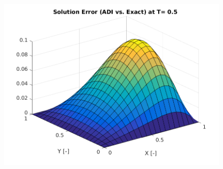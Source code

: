 \documentclass[12pt]{article}
\begin{document}
	\begin{figure}[H]
		\centering
		\includegraphics[height=3.75in]{solution_error.png}
		\label{fig:error}
	\end{figure}	
	
	
	
	
	
\end{document}
